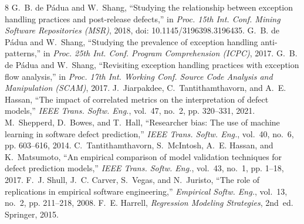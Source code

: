 \documentclass[conference]{IEEEtran}
\begin{document}
\begin{thebibliography}{8}
\footnotesize
{}
G.~B. de P\'adua and W.~Shang, ``Studying the relationship between exception handling practices and post-release defects,'' in \emph{Proc. 15th Int. Conf. Mining Software Repositories (MSR)}, 2018, doi: 10.1145/3196398.3196435.
G.~B. de P\'adua and W.~Shang, ``Studying the prevalence of exception handling anti-patterns,'' in \emph{Proc. 25th Int. Conf. Program Comprehension (ICPC)}, 2017.
G.~B. de P\'adua and W.~Shang, ``Revisiting exception handling practices with exception flow analysis,'' in \emph{Proc. 17th Int. Working Conf. Source Code Analysis and Manipulation (SCAM)}, 2017.
J.~Jiarpakdee, C.~Tantithamthavorn, and A.~E. Hassan, ``The impact of correlated metrics on the interpretation of defect models,'' \emph{IEEE Trans. Softw. Eng.}, vol.~47, no.~2, pp. 320--331, 2021.
M.~Shepperd, D.~Bowes, and T.~Hall, ``Researcher bias: The use of machine learning in software defect prediction,'' \emph{IEEE Trans. Softw. Eng.}, vol.~40, no.~6, pp. 603--616, 2014.
C.~Tantithamthavorn, S.~McIntosh, A.~E. Hassan, and K.~Matsumoto, ``An empirical comparison of model validation techniques for defect prediction models,'' \emph{IEEE Trans. Softw. Eng.}, vol.~43, no.~1, pp. 1--18, 2017.
F.~J. Shull, J.~C. Carver, S.~Vegas, and N.~Juristo, ``The role of replications in empirical software engineering,'' \emph{Empirical Softw. Eng.}, vol.~13, no.~2, pp. 211--218, 2008.
F.~E. Harrell, \emph{Regression Modeling Strategies}, 2nd~ed. Springer, 2015.
\end{thebibliography}
\end{document}

